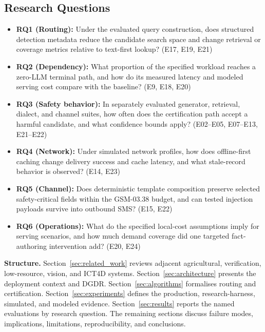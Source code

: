 \documentclass[11pt,a4paper]{article}
\begin{document}
\subsection{Research Questions}
\begin{itemize}[leftmargin=1.8em]
    \item \textbf{RQ1 (Routing):} Under the evaluated query construction, does structured detection metadata reduce the candidate search space and change retrieval or coverage metrics relative to text-first lookup? (E17, E19, E21)
    \item \textbf{RQ2 (Dependency):} What proportion of the specified workload reaches a zero-LLM terminal path, and how do its measured latency and modeled serving cost compare with the baseline? (E9, E18, E20)
    \item \textbf{RQ3 (Safety behavior):} In separately evaluated generator, retrieval, dialect, and channel suites, how often does the certification path accept a harmful candidate, and what confidence bounds apply? (E02--E05, E07--E13, E21--E22)
    \item \textbf{RQ4 (Network):} Under simulated network profiles, how does offline-first caching change delivery success and cache latency, and what stale-record behavior is observed? (E14, E23)
    \item \textbf{RQ5 (Channel):} Does deterministic template composition preserve selected safety-critical fields within the GSM-03.38 budget, and can tested injection payloads survive into outbound SMS? (E15, E22)
    \item \textbf{RQ6 (Operations):} What do the specified local-cost assumptions imply for serving scenarios, and how much demand coverage did one targeted fact-authoring intervention add? (E20, E24)
\end{itemize}

\noindent\textbf{Structure.} Section~\ref{sec:related_work} reviews adjacent agricultural, verification, low-resource, vision, and ICT4D systems. Section~\ref{sec:architecture} presents the deployment context and DGDR. Section~\ref{sec:algorithms} formalises routing and certification. Section~\ref{sec:experiments} defines the production, research-harness, simulated, and modeled evidence. Section~\ref{sec:results} reports the named evaluations by research question. The remaining sections discuss failure modes, implications, limitations, reproducibility, and conclusions.


\end{document}
